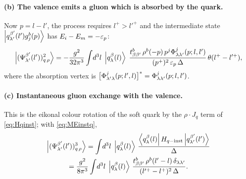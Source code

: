 \paragraph{(b) The valence emits a gluon which is absorbed by the quark.}
\begin{center}
\end{center}
Now $p=l-l'$, the process requires $l^{+}>l'^{+}$ and the intermediate state
$\left|q^{\beta'}_{\lambda'}(l')g^{b}_{j}(p)\right\rangle$ has $E_{i}-E_{m}=-\varepsilon_{p}$:
\begin{equation}
\left|(\Psi^{\beta'}_{\lambda'}(l'))^{2}_{q\,\rho}\right\rangle=-\frac{g^{2}}{32\pi^{3}}\int\!d^{3}l\;\left|q^{\beta}_{\lambda}(l)\right\rangle\;
\frac{t^{b}_{\beta\beta'}\,\rho^{b}(-p)\,p^{j}\Phi^{j}_{\lambda\lambda'}(p;l,l')}{(p^{+})^{2}\,\varepsilon_{p}\,\Delta}\,
\theta(l^{+}-l'^{+}) ,
\label{eq:P1b}
\end{equation}
where the absorption vertex is $\big[\Phi^{j}_{\lambda'\lambda}(p;l',l)\big]^{*}=\Phi^{j}_{\lambda\lambda'}(p;l,l')$.

\paragraph{(c) Instantaneous gluon exchange with the valence.}
\begin{center}
\end{center}
This is the eikonal colour rotation of the soft quark by the $\rho\cdot J_{q}$ term of
\eqref{eq:Hqinst}; with \eqref{eq:MEinstq},
\begin{multline}
\left|(\Psi^{\beta'}_{\lambda'}(l'))^{3}_{q\,\rho}\right\rangle=\int\!d^{3}l\;\left|q^{\beta}_{\lambda}(l)\right\rangle\,
\frac{\left\langle q^{\beta}_{\lambda}(l)\right|H_{q-{\rm inst}}\left|q^{\beta'}_{\lambda'}(l')\right\rangle}{\Delta}\\
=\frac{g^{2}}{8\pi^{3}}\int\!d^{3}l\;\left|q^{\beta}_{\lambda}(l)\right\rangle\,
\frac{t^{b}_{\beta\beta'}\,\rho^{b}(l'-l)\,\delta_{\lambda\lambda'}}{(l'^{+}-l^{+})^{2}\,\Delta} .
\label{eq:P1c}
\end{multline}

